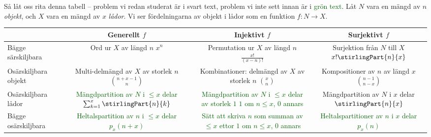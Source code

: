 \documentclass[nobib]{tufte-handout}
\begin{document}
Så låt oss rita denna tabell -- problem vi redan studerat är i svart text, problem vi inte sett innan är i \textcolor{darkgreen}{grön text}. Låt $N$ vara en mängd av $n$ \emph{objekt}, och $X$ vara en mängd av $x$ \emph{lådor}. Vi ser fördelningarna av objekt i lådor som en funktion $f: N \to X$.

\begin{fullwidth}
  \begin{tabularx}{\linewidth}{l|ccc}
      & Generellt $f$ & Injektivt $f$ & Surjektivt $f$\\
      \midrule
    Bägge särskiljbara & \specialcell{Ord ur $X$ av längd $n$\\ $x^n$} & \specialcell{Permutation ur $X$ av längd $n$\\ $\frac{x!}{(x-n)!}$} & \specialcell{Surjektion från $N$ till $X$\\$x!\stirlingPart{n}{x}$} \\
    Osärskiljbara objekt & \specialcell{Multi-delmängd av $X$\\ av storlek $n$\\$\binom{n + x - 1}{n}$} & \specialcell{Kombinationer:\\delmängd av $X$ av storlek $n$\\$\binom{x}{n}$} & \specialcell{Kompositioner av $n$\\av längd $x$\\$\binom{n - 1}{n - x}$} \\
    Osärskiljbara lådor & \specialcell{\textcolor{darkgreen}{Mängdpartition av $N$}\\ \textcolor{darkgreen}{ i $\leq x$ delar} \\\textcolor{darkgreen}{$\sum_{k=1}^{x} \stirlingPart{n}{k}$}} & \specialcell{\textcolor{darkgreen}{Mängdpartition av $N$}\\ \textcolor{darkgreen}{i $\leq x$ delar av storlek $1$}\\\textcolor{darkgreen}{$1$ om $n \leq x$, $0$ annars}} & \specialcell{Mängdpartition av $N$\\i $x$ delar\\$\stirlingPart{n}{x}$} \\
    Bägge osärskiljbara & \specialcell{\textcolor{darkgreen}{Heltalspartition av $n$ i $\leq x$ delar}\\\textcolor{darkgreen}{$p_x(n + x)$}} & \specialcell{\textcolor{darkgreen}{Sätt att skriva $n$ som}\\\textcolor{darkgreen}{summan av $\leq x$ ettor}\\\textcolor{darkgreen}{$1$ om $n \leq x$, $0$ annars}} & \specialcell{\textcolor{darkgreen}{Heltalspartitioner av $n$}\\ \textcolor{darkgreen}{i $x$ delar} \\\textcolor{darkgreen}{$p_x(n)$}} 
  \end{tabularx}
\end{fullwidth}
\end{document}
